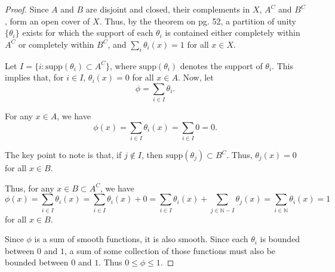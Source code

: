 \documentclass[12pt]{article}
\newcommand{\N}{\mathbb{N}}
\begin{document}
\begin{proof}

Since $A$ and $B$ are disjoint and closed, their complements in $X$, $A^C$ and $B^C$, form an open cover of $X$.  Thus, by the theorem on pg. 52, a partition of unity $\{\theta_i\}$ exists for which the support of each $\theta_i$ is contained either completely within $A^C$ or completely within $B^C$, and $\sum_i \theta_i(x) = 1$ for all $x \in X$.

Let $I = \{i: \textrm{supp}(\theta_i) \subset A^C \}$, where $\textrm{supp}(\theta_i)$ denotes the support of $\theta_i$.  This implies that, for $i \in I$, $\theta_i(x) = 0$ for all $x \in A$.
Now, let $$\phi = \sum\limits_{i \in I} \theta_i.$$

For any $x \in A$, we have $$\phi(x) = \sum\limits_{i \in I} \theta_i(x) = \sum\limits_{i \in I} 0 = 0.$$

The key point to note is that, if $j \not \in I$, then $\textrm{supp}(\theta_j) \subset B^C$.  Thus, $\theta_j(x) = 0$ for all $x \in B$.

Thus, for any $x \in B \subset A^C$, we have $$\phi(x) = \sum\limits_{i \in I} \theta_i(x) = \sum\limits_{i \in I} \theta_i(x) + 0 = \sum\limits_{i \in I} \theta_i(x) + \sum\limits_{j \in \N - I} \theta_j(x) 
=\sum\limits_{i \in \N} \theta_i(x) = 1$$ for all $x \in B$.

Since $\phi$ is a sum of smooth functions, it is also smooth.  Since each $\theta_i$ is bounded between $0$ and $1$, a sum of some collection of those functions must also be bounded between $0$ and $1$.  Thus $0 \leq \phi \leq 1$.

\end{proof}
\end{document}
